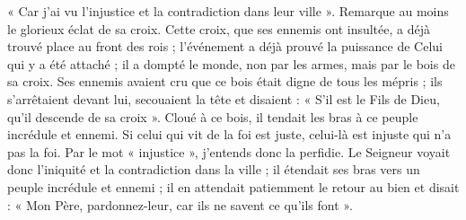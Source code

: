  « Car j’ai vu l’injustice et la contradiction dans leur ville ». Remarque au moins le glorieux éclat de sa croix. Cette croix, que ses ennemis ont insultée, a déjà trouvé place au front des rois ; l’événement a déjà prouvé la puissance de Celui qui y a été attaché ; il a dompté le monde, non par les armes, mais par le bois de sa croix. Ses ennemis avaient cru que ce bois était digne de tous les mépris ; ils s’arrêtaient devant lui, secouaient la tête et disaient : « S’il est le Fils de Dieu, qu’il descende de sa croix ». Cloué à ce bois, il tendait les bras à ce peuple incrédule et ennemi. Si celui qui vit de la foi est juste, celui-là est injuste qui n’a pas la foi. Par le mot « injustice », j’entends donc la perfidie. Le Seigneur voyait donc l’iniquité et la contradiction dans la ville ; il étendait ses bras vers un peuple incrédule et ennemi ; il en attendait patiemment le retour au bien et disait : « Mon Père, pardonnez-leur, car ils ne savent ce qu’ils font ».
